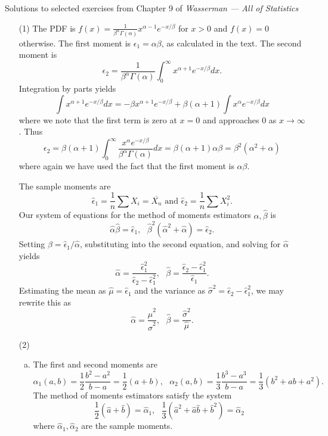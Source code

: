 \documentclass[10pt]{article}
\begin{document}
\noindent \large{Solutions to selected exercises from Chapter 9 of
\emph{Wasserman --- All of Statistics}}

\begin{enumerate}
\item[(1)]
The PDF is $f(x)=\frac{1}{\beta^\alpha \Gamma(\alpha)}x^{\alpha-1}e^{-x/\beta}$
for $x>0$ and $f(x)=0$ otherwise.
The first moment is $\epsilon_1=\alpha\beta$, as calculated in the text.
The second moment is
\[
\epsilon_2 = \frac{1}{\beta^\alpha \Gamma(\alpha)}
\int_0^\infty x^{\alpha+1}e^{-x/\beta}dx.
\]
Integration by parts yields
\[
\int x^{\alpha+1}e^{-x/\beta}dx = -\beta x^{\alpha+1}e^{-x/\beta} +
\beta(\alpha+1)\int x^{\alpha}e^{-x/\beta}dx
\]
where we note that the first term is zero at $x=0$ and approaches 0 as
$x\to \infty$.
Thus
\[
\epsilon_2 =
\beta(\alpha+1)\int_0^\infty \frac{x^\alpha e^{-x/\beta}}{\beta^\alpha\Gamma(\alpha)}dx
= \beta(\alpha+1)\alpha\beta=\beta^2(\alpha^2+\alpha)
\]
where again we have used the fact that the first moment is $\alpha\beta$.

The sample moments are
\[
\hat \epsilon_1 = \frac{1}{n} \sum X_i = \overline{X_n} \text{ and }
\hat \epsilon_2 = \frac{1}{n} \sum X_i^2.
\]
Our system of equations for the method of moments estimators
$\hat \alpha, \hat \beta$ is
\[
\hat \alpha \hat \beta = \hat \epsilon_1, \ \ \
\hat \beta^2 (\hat \alpha^2 + \hat \alpha) = \hat \epsilon_2.
\]
Setting $\hat \beta=\hat \epsilon_1 / \hat \alpha$, substituting into the
second equation, and solving for $\hat \alpha$ yields
\[
\hat \alpha = \frac{\hat \epsilon_1^2}{\hat \epsilon_2 - \hat \epsilon_1^2}, \ \ \
\hat \beta = \frac{\hat \epsilon_2 - \hat \epsilon_1^2}{\hat \epsilon_1}.
\]
Estimating the mean as $\hat \mu = \hat \epsilon_1$ and the variance as
$\hat \sigma^2 = \hat \epsilon_2 - \hat \epsilon_1^2$, we may rewrite this as
\[
\hat \alpha = \frac{\hat \mu^2}{\hat \sigma^2}, \ \ \
\hat \beta = \frac{\hat \sigma^2}{\hat \mu}.
\]

\item[(2)]
\begin{enumerate}[(a)]
\item The first and second moments are
\[
\alpha_1(a, b) = \frac{1}{2}\frac{b^2-a^2}{b-a} =
\frac{1}{2}(a+b), \ \ \
\alpha_2(a, b) = \frac{1}{3}\frac{b^3-a^3}{b-a} =
\frac{1}{3}(b^2+ab+a^2).
\]
The method of moments estimators satisfy the system
\[
\frac{1}{2}(\hat a + \hat b) = \hat \alpha_1, \ \ \
\frac{1}{3}(\hat a^2 + \hat a \hat b + \hat b^2) = \hat \alpha_2
\]
where $\hat \alpha_1, \hat \alpha_2$ are the sample moments.


\end{enumerate}
\end{enumerate}
\end{document}
